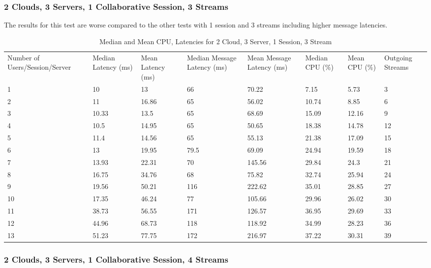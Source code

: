 \clearpage\subsubsection{2 Clouds, 3 Servers, 1 Collaborative Session, 3 Streams}

The results for this test are worse compared to the other tests with 1 session and 3 streams including higher message latencies.

\begin{table}
\caption{Median and Mean CPU, Latencies for 2 Cloud, 3 Server, 1 Session, 3 Stream}
\label{table:2cld_3serv_1sess_3str}
\begin{tabu} to\linewidth{|X[c]|X[c]|X[c]|X[c]|X[c]|X[c]|X[c]|X[c]|}
\everyrow{\hline}
\hline
Number of Users/Session/Server & Median Latency (ms) & Mean Latency (ms) & Median Message Latency (ms) & Mean Message Latency (ms) & Median CPU (\%) & Mean CPU (\%) & Outgoing Streams\\
1 & 10 & 13 & 66 & 70.22 & 7.15 & 5.73 & 3 \\
2 & 11 & 16.86 & 65 & 56.02 & 10.74 & 8.85 & 6 \\
3 & 10.33 & 13.5 & 65 & 68.69 & 15.09 & 12.16 & 9 \\
4 & 10.5 & 14.95 & 65 & 50.65 & 18.38 & 14.78 & 12 \\
5 & 11.4 & 14.56 & 65 & 55.13 & 21.38 & 17.09 & 15 \\
6 & 13 & 19.95 & 79.5 & 69.09 & 24.94 & 19.59 & 18 \\
7 & 13.93 & 22.31 & 70 & 145.56 & 29.84 & 24.3 & 21 \\
8 & 16.75 & 34.76 & 68 & 75.82 & 32.74 & 25.94 & 24 \\
9 & 19.56 & 50.21 & 116 & 222.62 & 35.01 & 28.85 & 27 \\
10 & 17.35 & 46.24 & 77 & 105.66 & 29.96 & 26.02 & 30 \\
11 & 38.73 & 56.55 & 171 & 126.57 & 36.95 & 29.69 & 33 \\
12 & 44.96 & 68.73 & 118 & 118.92 & 34.99 & 28.23 & 36 \\
13 & 51.23 & 77.75 & 172 & 216.97 & 37.22 & 30.31 & 39 \\
\end{tabu}
\end{table}

\clearpage\subsubsection{2 Clouds, 3 Servers, 1 Collaborative Session, 4 Streams}

